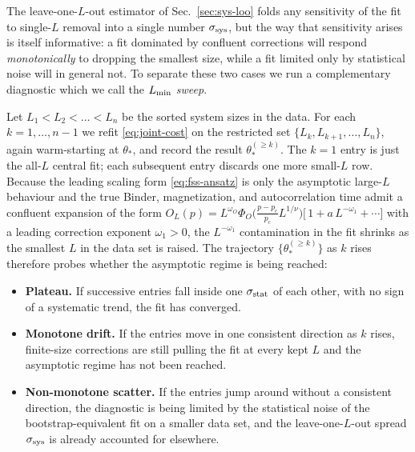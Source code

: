 \documentclass[pra,aps,twocolumn,groupedaddress,superscriptaddress,nofootinbib,preprintnumbers]{revtex4-2}
\begin{document}
\begin{widetext}
		\label{sec:lmin-sweep}
		
		The leave-one-$L$-out estimator of Sec.~\ref{sec:sys-loo} folds
		any sensitivity of the fit to single-$L$ removal into a single
		number $\sigma_{\rm sys}$, but the way that sensitivity arises is
		itself informative: a fit dominated by confluent corrections will
		respond \emph{monotonically} to dropping the smallest size, while a
		fit limited only by statistical noise will in general not. 
		To separate these two cases we run a complementary diagnostic which
		we call the \emph{$L_{\rm min}$ sweep}.
		
		Let $L_1 < L_2 < \dots < L_n$ be the sorted system sizes in the data.
		For each $k = 1,\dots,n-1$ we refit \eqref{eq:joint-cost} on the
		restricted set $\{L_k, L_{k+1}, \dots, L_n\}$, again warm-starting at
		$\theta_*$, and record the result $\theta_*^{(\geq k)}$. The
		$k=1$ entry is just the all-$L$ central fit; each subsequent entry
		discards one more small-$L$ row. Because the leading scaling form
		\eqref{eq:fss-ansatz} is only the asymptotic large-$L$ behaviour and
		the true Binder, magnetization, and autocorrelation
		time admit a confluent expansion of the form
		$O_L(p) = L^{\omega_O}\Phi_O\bigl(\tfrac{p-p_c}{p_c} L^{1/\nu}\bigr)
		\bigl[\,1 + a\,L^{-\omega_1} + \cdots\bigr]$ with a leading correction
		exponent $\omega_1 > 0$, the $L^{-\omega_1}$ contamination in the fit
		shrinks as the smallest $L$ in the data set is raised. The trajectory
		$\{\theta_*^{(\geq k)}\}$ as $k$ rises therefore probes whether the
		asymptotic regime is being reached:
		
		\begin{itemize}
			\item \textbf{Plateau.} If successive entries fall inside one
			$\sigma_{\rm stat}$ of each other, with no sign of a systematic
			trend, the fit has converged.
			\item \textbf{Monotone drift.} If the entries move in one
			consistent direction as $k$ rises, finite-size corrections are
			still pulling the fit at every kept $L$ and the asymptotic regime
			has not been reached.
			\item \textbf{Non-monotone scatter.} If the entries jump around
			without a consistent direction, the diagnostic is being limited by
			the statistical noise of the bootstrap-equivalent fit on a smaller
			data set, and the leave-one-$L$-out spread $\sigma_{\rm sys}$ is
			already accounted for elsewhere.
		\end{itemize}
		

\end{widetext}
\end{document}
